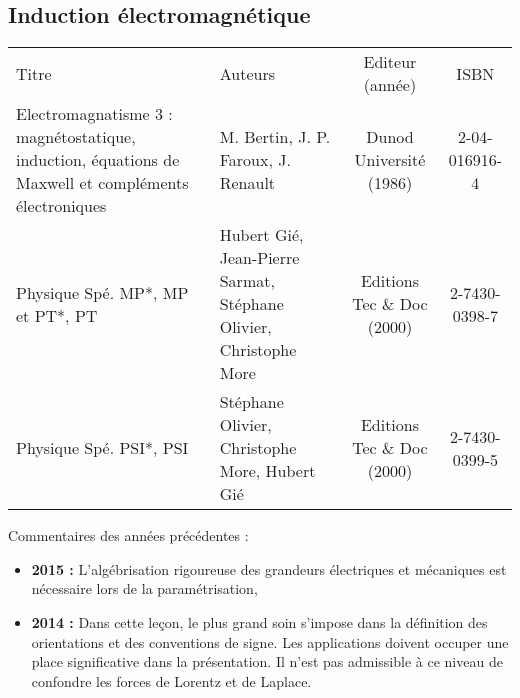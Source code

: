 \begin{headerBlock}
 \chapter{Induction électromagnétique}
 \label{LP_Induction}
\end{headerBlock}

\begin{center}
\begin{tabularx}{\textwidth}{| X | X | c | c |}
  \hline
  \rowcolor{gray!20}\multicolumn{4}{c}{Bibliographie de la leçon : } \\
  \hline 
  Titre & Auteurs & Editeur (année) & ISBN \\
  \hline
   Electromagnatisme 3 : magnétostatique, induction, équations de Maxwell et compléments électroniques & M. Bertin, J. P. Faroux, J. Renault & Dunod Université (1986) & 2-04-016916-4 \\
  \hline 
   Physique Spé. MP*, MP et PT*, PT & Hubert Gié, Jean-Pierre Sarmat, Stéphane Olivier, Christophe More & Editions Tec \& Doc (2000) & 2-7430-0398-7 \\
  \hline 
   Physique Spé. PSI*, PSI & Stéphane Olivier, Christophe More, Hubert Gié & Editions Tec \& Doc (2000) & 2-7430-0399-5 \\
  \hline 
\end{tabularx}
\end{center}

\begin{reportBlock}{Commentaires des années précédentes :}
    \begin{itemize}
        \item \textbf{2015 :} L’algébrisation rigoureuse des grandeurs électriques et mécaniques est nécessaire lors de la paramétrisation,
        \item \textbf{2014 :} Dans cette leçon, le plus grand soin s’impose dans la définition des orientations et des conventions de signe. Les applications doivent occuper une place significative dans la présentation. Il n’est pas admissible à ce niveau de confondre les forces de Lorentz et de Laplace.
    \end{itemize}
\end{reportBlock}

